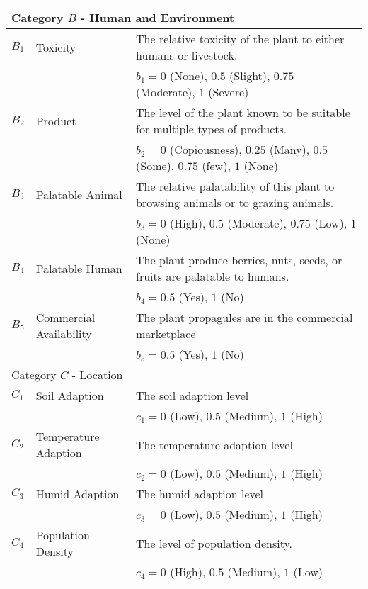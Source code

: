 \documentclass[12pt]{article}
\begin{document}
{{\begin{longtable}{p{0.2in}p{1.5in}p{4.3in}}
				\midrule
				\multicolumn{3}{l}{Category $B$ - Human and Environment}  \\
				\midrule
				
				$B_1$ & Toxicity & The relative toxicity of the plant to either humans or livestock.\\
					&& $b_1=0$ (None), $0.5$ (Slight), $0.75$ (Moderate), $1$ (Severe)\\
				$B_2$ & Product & The level of the plant known to be suitable for multiple types of products.\\
					&& $b_2=0$ (Copiousness), $0.25$ (Many), $0.5$ (Some), $0.75$ (few), $1$ (None)\\
				$B_3$ & Palatable Animal & The relative palatability of this plant to browsing animals or to grazing animals.\\
					&& $b_3=0$ (High), $0.5$ (Moderate), $0.75$ (Low), $1$ (None)\\
				$B_4$ & Palatable Human & The plant produce berries, nuts, seeds, or fruits are palatable to humans. \\
					&& $b_4=0.5$ (Yes), $1$ (No)\\
				$B_5$ & Commercial Availability & The plant propagules are in the commercial marketplace \\
					&& $b_5=0.5$ (Yes), $1$ (No)\\
			
				\midrule
				\multicolumn{3}{l}{Category $C$ - Location}  \\
				\midrule
				
				$C_1$ & Soil Adaption & The soil adaption level\\
				&& $c_1=0$ (Low), $0.5$ (Medium), $1$ (High)\\
				$C_2$ & Temperature Adaption & The temperature adaption level\\
				&& $c_2=0$ (Low), $0.5$ (Medium), $1$ (High)\\
				$C_3$ & Humid Adaption & The humid adaption level\\
				&& $c_3=0$ (Low), $0.5$ (Medium), $1$ (High)\\
				$C_4$ & Population Density & The level of population density.\\
				&& $c_4=0$ (High), $0.5$ (Medium), $1$ (Low)\\
			
				\bottomrule
			
			\end{longtable}
			}
		}
		
\end{document}

